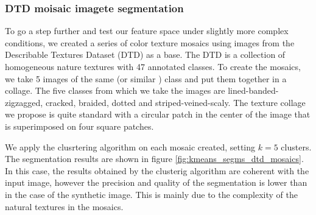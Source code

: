 \subsubsection{DTD moisaic imagete segmentation}
To go a step further and test our feature space under slightly more complex conditions, we created a series of color texture mosaics using images from the Describable Textures Dataset (DTD) \citep{Cimpoi.Maji.ea:CVPR:2014} as a base. The DTD is a collection of homogeneous nature textures with 47 annotated classes. To create the mosaics, we take 5 images of the same (or similar ) class and put them together in a collage. The five classes from which we take the images are lined-banded-zigzagged, cracked, braided, dotted and striped-veined-scaly. The texture collage we propose is quite standard with a circular patch in the center of the image that is superimposed on four square patches. 

We apply the clusrtering algorithm on each mosaic created, setting $ k = 5 $ clusters. The segmentation results are shown in figure \ref{fig:kmeans_segms_dtd_mosaics}. In this case, the results obtained by the clusterig algorithm are coherent with the input image, however the precision and quality of the segmentation is lower than in the case of the synthetic image. This is mainly due to the complexity of the natural textures in the mosaics. 

